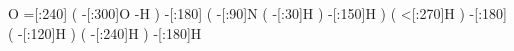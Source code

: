            O%
    =[:240]%
              (
        -[:300]O%
              -H%
              )
    -[:180]%
              (
         -[:90]N%
                  (
             -[:30]H%
                  )
        -[:150]H%
              )
              (
        <[:270]H%
              )
    -[:180]%
              (
        -[:120]H%
              )
              (
        -[:240]H%
              )
    -[:180]H%